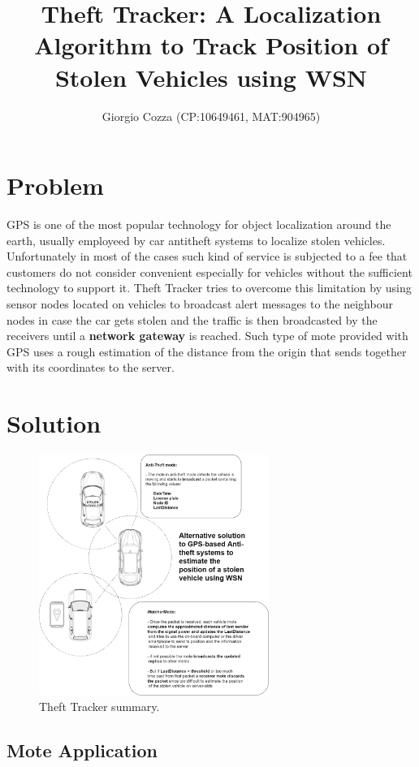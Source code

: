 \documentclass[]{article}
\title{Theft Tracker: A Localization Algorithm to Track Position of Stolen Vehicles using WSN}
\author{Giorgio Cozza (CP:10649461, MAT:904965)}
\begin{document}
\maketitle

\section{Problem}

GPS is one of the most popular technology for object localization around the earth, usually employeed by car antitheft systems to localize stolen vehicles. Unfortunately in most of the cases such kind of service is subjected to a fee that customers do not consider convenient especially for vehicles without the sufficient technology to support it. 
Theft Tracker tries to overcome this limitation by using sensor nodes located on vehicles to broadcast alert messages to the neighbour nodes in case the car gets stolen and the traffic is then broadcasted by the receivers until a \textbf{network gateway} is reached. Such type of mote provided with GPS uses a rough estimation of the distance from the origin that sends together with its coordinates to the server.


\section{Solution}

\begin{figure}
\includegraphics[width=7.5cm]{./images/theft_tracker_summary.png}
\caption{Theft Tracker summary.}\label{wrap-fig:1}
\end{figure}

\subsection{Mote Application}
\end{document}
